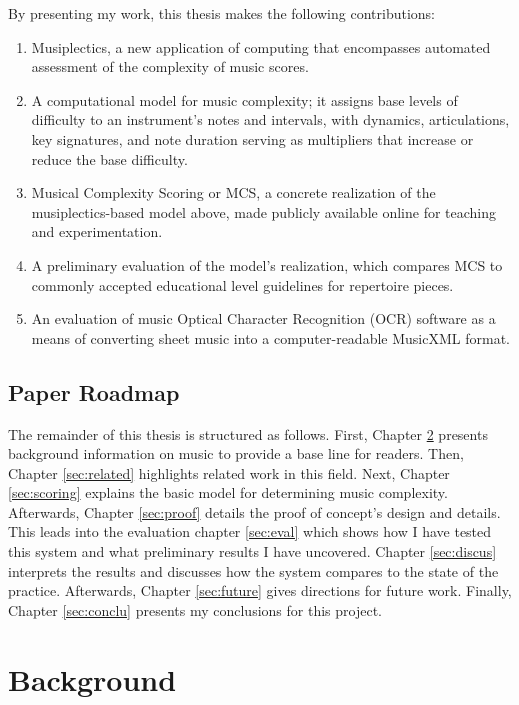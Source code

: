 \documentclass[12pt]{report}
\begin{document}
By presenting my work, this thesis makes the following contributions:

\begin{enumerate}
\item Musiplectics, a new application of computing that encompasses automated assessment of the complexity of music scores.
\item A computational model for music complexity; it assigns base levels of difficulty to an instrument's notes and intervals, with dynamics, articulations, key signatures, and note duration serving as multipliers that increase or reduce the base difficulty.
\item Musical Complexity Scoring or MCS, a concrete realization of the musiplectics-based model above, made publicly available online for teaching and experimentation.
\item A preliminary evaluation of the model's realization, which compares MCS to commonly accepted educational level guidelines for repertoire pieces.
\item An evaluation of music Optical Character Recognition (OCR) software as a means of converting sheet music into a computer-readable MusicXML format.
\end{enumerate}

\section{Paper Roadmap} 
\label{sec:layout}

The remainder of this thesis is structured as follows. First, Chapter \ref{sec:background} presents background information on music to provide a base line for readers. Then, Chapter \ref{sec:related} highlights related work in this field. Next, Chapter \ref{sec:scoring} explains the basic model for determining music complexity. Afterwards, Chapter \ref{sec:proof} details the proof of concept's design and details. This leads into the evaluation chapter \ref{sec:eval} which shows how I have tested this system and what preliminary results I have uncovered. Chapter \ref{sec:discus} interprets the results and discusses how the system compares to the state of the practice. Afterwards, Chapter \ref{sec:future} gives directions for future work. Finally, Chapter \ref{sec:conclu} presents my conclusions for this project.

\chapter{Background} 
\label{sec:background}
\end{document}
